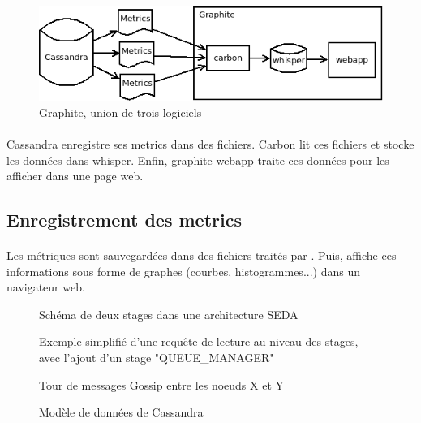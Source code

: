 \documentclass[12pt]{article}
\begin{document}
\vspace{0.5cm} %

\begin{figure}[H]
	\centering
		\includegraphics[width=12cm]{schemas/graphite.png}
	\caption{Graphite, union de trois logiciels}
\end{figure}

\paragraph{} Cassandra enregistre ses metrics dans des fichiers.
Carbon lit ces fichiers et stocke les données dans whisper.
Enfin, graphite webapp traite ces données pour les afficher dans une page web.

\subsection{Enregistrement des metrics}







\paragraph{} Les métriques sont sauvegardées dans des fichiers traités par . 
Puis,  affiche ces informations sous forme de graphes (courbes, histogrammes...) dans un navigateur web.

\newpage



\begin{figure}[p]
	\centering
		
	\caption{Schéma de deux stages dans une architecture SEDA \label{fig:stages}}
\end{figure}

\begin{figure}[p]
	\centering
		
	\caption{Exemple simplifié d'une requête de lecture au niveau des stages, avec l'ajout d'un stage "QUEUE\_MANAGER" \label{fig:read_request}}
\end{figure}

\begin{figure}[p]
	\centering
		
	\caption{Tour de messages Gossip entre les noeuds X et Y \label{fig:round_gossip}}
\end{figure}

\begin{figure}[p]
	\centering
		
	\caption{Modèle de données de Cassandra \label{fig:keyspace}}
\end{figure}
\end{document}
